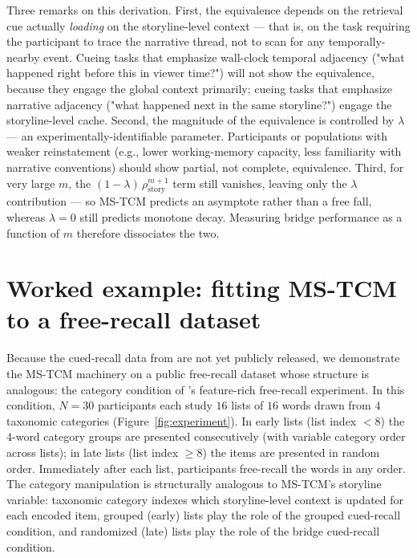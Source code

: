 \documentclass[10pt]{article}
\newcommand{\rhostory}{\rho_{\mathrm{story}}}
\begin{document}
Three remarks on this derivation. First, the equivalence depends on
the retrieval cue actually \emph{loading} on the storyline-level
context --- that is, on the task requiring the participant to trace
the narrative thread, not to scan for any temporally-nearby event.
Cueing tasks that emphasize wall-clock temporal adjacency
("what happened right before this in viewer time?") will not show
the equivalence, because they engage the global context primarily;
cueing tasks that emphasize narrative adjacency ("what happened next
in the same storyline?") engage the storyline-level cache. Second,
the magnitude of the equivalence is controlled by $\lambda$ ---
an experimentally-identifiable parameter. Participants or populations
with weaker reinstatement (e.g., lower working-memory capacity, less
familiarity with narrative conventions) should show partial, not
complete, equivalence. Third, for very large $m$, the
$(1-\lambda)\,\rhostory^{m+1}$ term still vanishes, leaving only the
$\lambda$ contribution --- so MS-TCM predicts an asymptote rather
than a free fall, whereas $\lambda = 0$ still predicts monotone
decay. Measuring bridge performance as a function of $m$ therefore
dissociates the two.

\section{Worked example: fitting MS-TCM to a free-recall dataset}
\label{sec:frfr}

Because the cued-recall data from \citet{XuDuncanManning} are not yet
publicly released, we demonstrate the MS-TCM machinery on a public
free-recall dataset whose structure is analogous: the category
condition of \citet{ManningEtAl2023FRFR}'s feature-rich free-recall
experiment. In this condition, $N=30$ participants each study $16$
lists of $16$ words drawn from $4$ taxonomic categories
(Figure~\ref{fig:experiment}). In early lists (list index $<8$) the
$4$-word category groups are presented consecutively (with variable
category order across lists); in late lists (list index $\geq 8$) the
items are presented in random order. Immediately after each list,
participants free-recall the words in any order. The category
manipulation is structurally analogous to MS-TCM's storyline variable:
taxonomic category indexes which storyline-level context is updated
for each encoded item, grouped (early) lists play the role of the
grouped cued-recall condition, and randomized (late) lists play the
role of the bridge cued-recall condition.
\end{document}
